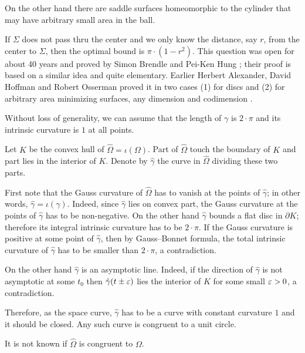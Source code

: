 On the other hand there are saddle surfaces homeomorphic to the cylinder
that may have arbitrary small area in the ball. 

If $\Sigma$ does not pass thru the center 
and we only know the distance, say $r$, 
from the center to $\Sigma$,
then the optimal bound is $\pi\cdot(1-r^2)$.
This question was open for about 40 years and proved by Simon Brendle and Pei-Ken Hung \cite[see][]{brende-hung};
their proof is based on a similar idea and quite elementary.
Earlier Herbert Alexander, 
David Hoffman
and Robert Osserman 
proved it in two cases (1) for discs and (2) for arbitrary area minimizing surfaces, any dimension and codimension
 \cite[see][]{alexander-osserman,alexander-hoffman-osserman}.






Without loss of generality, we can assume that the length of $\gamma$ is $2{\cdot}\pi$ and its intrinsic curvature is $1$ at all points.

Let $K$ be the convex hull of $\hat\Omega=\iota(\Omega)$.
Part of $\hat\Omega$ touch the boundary of $K$ and part lies in the interior of $K$. 
Denote by $\hat\gamma$ the curve in $\hat\Omega$ dividing these two parts.

First note that the Gauss curvature of $\hat\Omega$ has to vanish at the points of $\hat\gamma$;
in other words, $\hat\gamma=\iota(\gamma)$.
Indeed, since $\hat\gamma$ lies on convex part, 
the Gauss curvature at the points of $\hat\gamma$ has to be non-negative. 
On the other hand $\hat\gamma$ bounds a flat disc in $\partial K$;
therefore its integral intrinsic curvature has to be $2{\cdot}\pi$.
If the Gauss curvature is positive at some point of $\hat\gamma$, 
then by Gauss--Bonnet formula, the total intrinsic curvature of $\hat\gamma$ has to be smaller than $2{\cdot}\pi$, a contradiction.

On the other hand $\hat\gamma$ is an asymptotic line.
Indeed, if the direction of $\hat\gamma$ is not asymptotic at some $t_0$
then $\hat\gamma(t\pm\varepsilon)$ lies the interior of $K$ for some small $\varepsilon>0$, a contradiction.

Therefore, as the space curve,
$\hat\gamma$ has to be a curve with constant curvature $1$ and it should be closed.
Any such curve is congruent to a unit circle.\qeds

It is not known if $\hat\Omega$ is congruent to $\Omega$.

